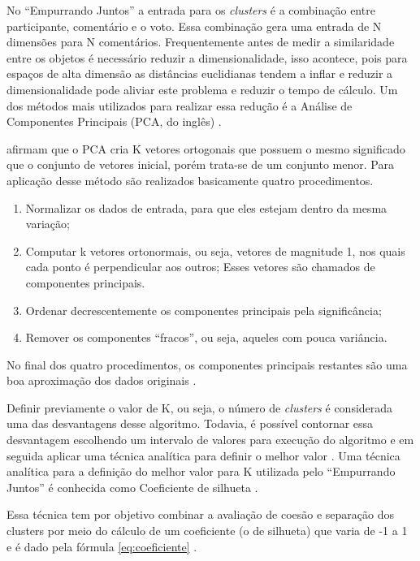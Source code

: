 No ``Empurrando Juntos'' a entrada para os \textit{clusters} é a combinação entre participante,  
comentário e o voto. Essa combinação gera uma entrada de N dimensões para N comentários.
Frequentemente antes de medir a similaridade entre os objetos é necessário
reduzir a dimensionalidade, isso acontece, pois para espaços de alta dimensão as distâncias euclidianas
tendem a inflar e reduzir a dimensionalidade pode aliviar este problema e reduzir o tempo de cálculo.
Um dos métodos mais utilizados para realizar essa redução é a Análise de 
Componentes Principais (PCA, do inglês) \cite{han2011data, sklearn}.


 afirmam que o PCA cria K vetores ortogonais que possuem o mesmo significado que o conjunto
de vetores inicial, porém trata-se de um conjunto menor. Para aplicação desse método são realizados basicamente quatro procedimentos.

\begin{enumerate}
 \item Normalizar os dados de entrada, para que eles estejam dentro da mesma variação;
 \item Computar k vetores ortonormais, ou seja, vetores de magnitude 1, nos quais cada ponto é perpendicular aos outros;
  \subitem Esses vetores são chamados de componentes principais.
 \item Ordenar decrescentemente os componentes principais pela significância;
 \item Remover os componentes ``fracos'', ou seja, aqueles com pouca variância.
\end{enumerate}

No final dos quatro procedimentos, os componentes principais restantes são uma boa aproximação dos dados originais \cite{han2011data}.

Definir previamente o valor de K, ou seja, o número de \textit{clusters} é considerada uma das desvantagens desse algoritmo. Todavia,
é possível contornar essa desvantagem escolhendo um intervalo de valores para execução do algoritmo e em seguida aplicar
uma técnica analítica para definir o melhor valor \cite{han2011data}. Uma técnica analítica para a definição do melhor valor para K utilizada pelo ``Empurrando Juntos''
é conhecida como Coeficiente de silhueta \cite{sklearn}.

Essa técnica tem por objetivo combinar a avaliação de coesão e separação dos clusters por meio do cálculo de um coeficiente (o de silhueta) que 
varia de -1 a 1 e é dado pela fórmula \ref{eq:coeficiente} \cite{tan2013data}.

